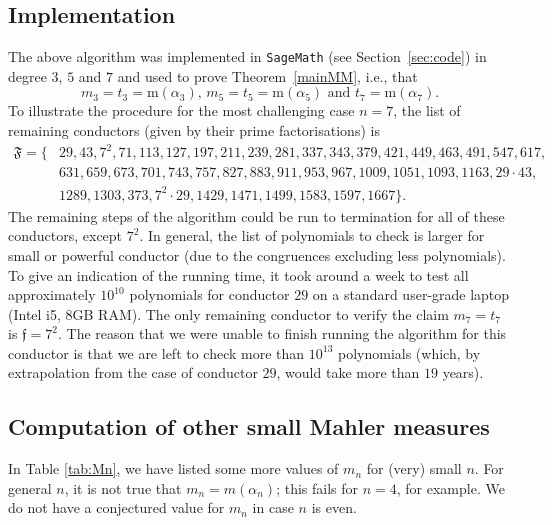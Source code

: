 \documentclass[12pt,reqno]{amsart}
\theoremstyle{definition}
\theoremstyle{plain}
\theoremstyle{definition}
\newcommand{\mf}{\mathfrak}
\newcommand\m{\mathrm{m}}
\begin{document}
\subsection{Implementation} The above algorithm was implemented in \texttt{SageMath} (see Section~\ref{sec:code}) in degree $3$, $5$ and $7$ and used to prove Theorem~\ref{mainMM}, i.e., that $$m_3 = t_3 = \m(\alpha_3), \, m_5 = t_5 = \m(\alpha_5) \mbox{ and }t_7 = \m(\alpha_7). $$  
To illustrate the procedure for the most challenging case $n=7$, the list of remaining conductors (given by their prime factorisations) is 
\begin{align*} \mf{F} =
\{ &29, 43, 7^2, 71, 113, 127, 197, 211, 239, 281, 337, 343, 379, 421, 449, 463, 491, 547, 617, \\ 
& 631, 659, 673, 701, 743, 757, 827, 883, 911, 953, 967, 1009, 1051, 1093, 1163, 29 \cdot 43, \\
& 1289, 1303, 373, 7^2 \cdot 29, 1429, 1471, 1499, 1583, 1597, 1667 \}.  
\end{align*} 
The remaining steps of the algorithm could be run to termination for all of these conductors, except $7^2$. 
In general, the list of polynomials to check is larger for small or powerful conductor (due to the congruences excluding less polynomials).  
To give an indication of the running time, it took around a week to test all approximately $10^{10}$ polynomials for conductor $29$ on a standard user-grade laptop (Intel i5, 8GB RAM).   
The only remaining conductor to verify the claim $m_7 = t_7$ is $\mf{f} = 7^2$. The reason that we were unable to finish running the algorithm for this conductor is that we are left to check more than $10^{13}$ polynomials (which, by extrapolation from the case of conductor $29$, would take more than $19$ years). 



\subsection{Computation of other small Mahler measures} 

In Table \ref{tab:Mn}, we have listed some more values of $m_n$ for (very) small $n$. For general $n$, it is not true that $m_n=m(\alpha_n)$; this fails for $n=4$, for example. We do not have a conjectured value for $m_n$ in case $n$ is even. 
\end{document}
